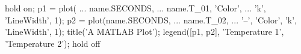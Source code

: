 hold on;
p1 = plot( ...
    {{name}}.SECONDS, ...
    {{name}}.T_01, 'Color',  ...
    'k', 'LineWidth', 1);
p2 = plot({{name}}.SECONDS, ...
    {{name}}.T_02, ...
    '--', 'Color', 'k', 'LineWidth', 1);
title('A MATLAB Plot');
legend([p1, p2], 'Temperature 1', 'Temperature 2');
hold off

